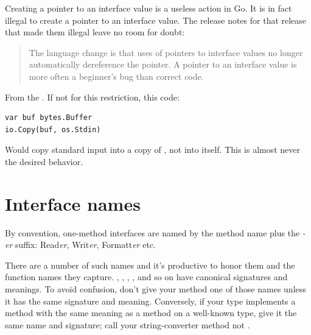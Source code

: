 \begin{lbar}
Creating a pointer to an interface value is a useless action in Go.
It is in fact illegal to
create a pointer to an interface value. The release notes for that release 
that
made them illegal leave no room for doubt:
\begin{quote}
The language change is that uses of pointers to interface values no longer 
automatically dereference the pointer.  A pointer to an interface value is more 
often a beginner's bug than correct code.
\end{quote}
From the \cite{go_faq}. If not for this restriction, this code:
\begin{lstlisting}
var buf bytes.Buffer
io.Copy(buf, os.Stdin)
\end{lstlisting}
Would copy standard input into a copy of , not into  itself. 
This is almost never the desired behavior.
\end{lbar}

\section{Interface names}
By convention, one-method interfaces are named by the method name plus
the \emph{-er} suffix: Read\emph{er}, Writ\emph{er}, Formatt\emph{er} etc.

There are a number of such names and it's productive to honor them and
the function names they capture. , ,
, ,  and
so on have canonical signatures and meanings. To avoid confusion, don't
give your method one of those names unless it has the same signature and
meaning. Conversely, if your type implements a method with the same
meaning as a method on a well-known type, give it the same name and
signature; call your string-converter method  not
.


